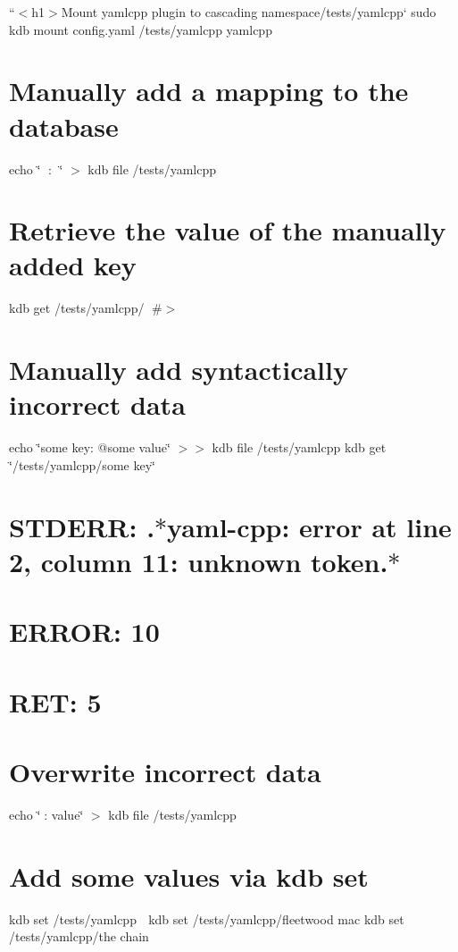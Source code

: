 ``{\ttfamily  $<$h1$>$Mount yamlcpp plugin to cascading namespace}/tests/yamlcpp` sudo kdb mount config.\+yaml /tests/yamlcpp yamlcpp

\section*{Manually add a mapping to the database}

echo \char`\"{}🔑 \+: 🐳\char`\"{} $>$ {\ttfamily kdb file /tests/yamlcpp} \section*{Retrieve the value of the manually added key}

kdb get /tests/yamlcpp/🔑 \#$>$ 🐳

\section*{Manually add syntactically incorrect data}

echo \char`\"{}some key\+: @some  value\char`\"{} $>$$>$ {\ttfamily kdb file /tests/yamlcpp} kdb get \char`\"{}/tests/yamlcpp/some key\char`\"{} \section*{S\+T\+D\+E\+RR\+: .$\ast$yaml-\/cpp\+: error at line 2, column 11\+: unknown token.$\ast$}

\section*{E\+R\+R\+OR\+: 10}

\section*{R\+ET\+: 5}

\section*{Overwrite incorrect data}

echo \char`\"{}🔑\+: value\char`\"{} $>$ {\ttfamily kdb file /tests/yamlcpp}

\section*{Add some values via {\ttfamily kdb set}}

kdb set /tests/yamlcpp 🎵 kdb set /tests/yamlcpp/fleetwood mac kdb set /tests/yamlcpp/the chain

